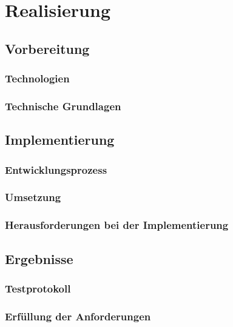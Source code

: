 \documentclass[thesis.tex]{subfiles}
\begin{document}
\chapter{Realisierung}\label{chap:realisierung}

\section{Vorbereitung}
\subsection{Technologien}
\subsection{Technische Grundlagen}
\section{Implementierung}
\subsection{Entwicklungsprozess}
\subsection{Umsetzung}
\subsection{Herausforderungen bei der Implementierung}
\section{Ergebnisse}
\subsection{Testprotokoll}
\subsection{Erfüllung der Anforderungen}

\subfilebib %
\end{document}
